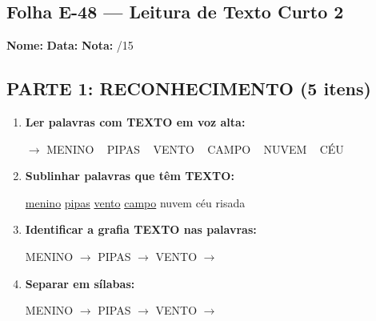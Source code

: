 \subsection{Folha E-48 --- Leitura de Texto Curto 2}
\begin{exercicio}



\noindent\textbf{Nome:} \underline{\hspace{3.2cm}} \quad \textbf{Data:} \underline{\hspace{1.6cm}} \quad \textbf{Nota:} \underline{\hspace{0.9cm}}/15


\subsection*{PARTE 1: RECONHECIMENTO (5 itens)}

\begin{enumerate}

  \item \textbf{Ler palavras com TEXTO em voz alta:}
  \begin{center}
  $\rightarrow$ MENINO ~ PIPAS ~ VENTO ~ CAMPO ~ NUVEM ~ CÉU
  \end{center}

  \item \textbf{Sublinhar palavras que têm TEXTO:}

\begin{center}
  \uline{menino} \quad \uline{pipas} \quad \uline{vento} \quad \uline{campo} \quad nuvem \quad céu \quad risada
\end{center}

  \item \textbf{Identificar a grafia TEXTO nas palavras:}
  \begin{center}
  MENINO $\rightarrow$ \underline{\hspace{1cm}} \quad PIPAS $\rightarrow$ \underline{\hspace{1cm}} \quad VENTO $\rightarrow$ \underline{\hspace{1cm}}
  \end{center}

  \item \textbf{Separar em sílabas:}
  \begin{center}
  MENINO $\rightarrow$ \underline{\hspace{1.2cm}} \quad PIPAS $\rightarrow$ \underline{\hspace{1.2cm}} \quad VENTO $\rightarrow$ \underline{\hspace{1.2cm}}
  \end{center}


\end{enumerate}
\end{exercicio}

